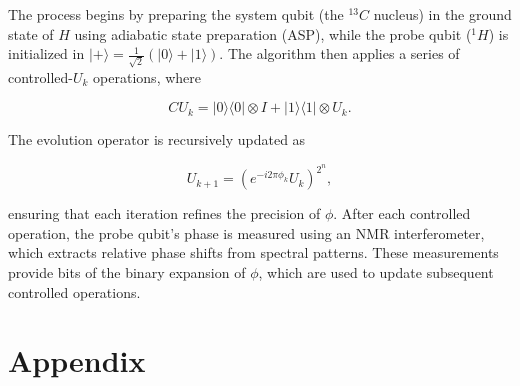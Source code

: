 \documentclass[11pt]{article}
\begin{document}
The process begins by preparing the system qubit (the \( ^{13}C \) nucleus) in the ground state of \( H \) using adiabatic state preparation (ASP), while the probe qubit (\( ^{1}H \)) is initialized in \( |+\rangle = \frac{1}{\sqrt{2}} (|0\rangle + |1\rangle) \). The algorithm then applies a series of controlled-\( U_k \) operations, where 

\[
C U_k = |0\rangle \langle 0| \otimes I + |1\rangle \langle 1| \otimes U_k.
\]

The evolution operator is recursively updated as

\[
U_{k+1} = (e^{-i 2\pi \phi_k} U_k)^{2^n},
\]

ensuring that each iteration refines the precision of \( \phi \). After each controlled operation, the probe qubit’s phase is measured using an NMR interferometer, which extracts relative phase shifts from spectral patterns. These measurements provide bits of the binary expansion of \( \phi \), which are used to update subsequent controlled operations.\\



\appendix
\section*{Appendix}
\end{document}
